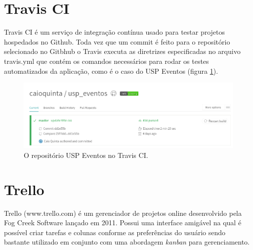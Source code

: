 \section{Travis CI}
\par Travis CI é um serviço de integração contínua usado para testar projetos hospedados no Github. Toda vez que um commit é feito para o repositório selecionado no Gitbhub o Travis executa as diretrizes especificadas no arquivo travis.yml que contém os comandos necessários para rodar os testes automatizados da aplicação, como é o caso do USP Eventos (figura \ref{fig:travis}).
\begin{figure}[htb]
\centering
\includegraphics[width=15cm]{figuras/travis}
\caption{\label{fig:travis} O repositório USP Eventos no Travis CI.}
\end{figure}

\section{Trello}
\par Trello (www.trello.com) é um gerenciador de projetos online desenvolvido pela Fog Creek Software lançado em 2011. Possui uma interface amigável na qual é possível criar tarefas e colunas conforme as preferências do usuário sendo bastante utilizado em conjunto com uma abordagem \emph{kanban} para gerenciamento.

